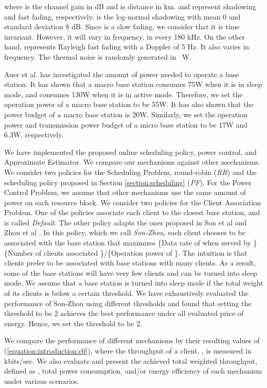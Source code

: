 \documentclass[conference]{IEEEtran}
\begin{document}
where  is the channel gain in dB and  is distance in km.  and  represent shadowing and fast fading, respectively.  is the log-normal shadowing with mean 0 and standard deviation 8 dB. Since  is a slow fading, we consider that it is time invariant. However, it will vary in frequency, in every 180 kHz. On the other hand,  represents Rayleigh fast fading with a Doppler of 5 Hz. It also varies in frequency. The thermal noise is randomly generated in ~W.

Auer et al. \cite{Auer11} has investigated the amount of power needed to operate a base station. It has shown that a macro base station consumes 75W when it is in sleep mode, and consumes 130W when it is in active mode. Therefore, we set the operation power of a macro base station to be 55W. It has also shown that the power budget of a macro base station is 20W. Similarly, we set the operation power and transmission power budget of a micro base station to be 17W and 6.3W, respectively.


We have implemented the proposed online scheduling policy, power control, and Approximate Estimator. We compare our mechanisms against other mechanisms. We consider two policies for the Scheduling Problem, round-robin (\emph{RR}) and the scheduling policy proposed in Section \ref{section:scheduling} (\emph{PF}). For the Power Control Problem, we assume that other mechanisms use the same amount of power on each resource block. We consider two policies for the Client Association Problem. One of the policies associate each client to the closest base station, and is called \emph{Default}. The other policy adapts the ones proposed in Son et al \cite{kson11} and Zhou et al \cite{SZ09}. In this policy, which we call \emph{Son-Zhou}, each client  chooses to be associated with the base station  that maximizes \{Data rate of  when served by \}\{Number of clients associated \}/\{Operation power of \}. The intuition is that clients prefer to be associated with base stations with many clients. As a result, some of the base stations will have very few clients and can be turned into sleep mode. We assume that a base station is turned into sleep mode if the total weight of its clients is below a certain threshold. We have exhaustively evaluated the performance of Son-Zhou using different thresholds and found that setting the threshold to be 2 achieves the best performance under all evaluated price of energy. Hence, we set the threshold to be 2.

We compare the performance of different mechanisms by their resulting values of (\ref{equation:introduction:c0}), where the throughput of a client, , is measured in kbits/sec.  We also evaluate and present the achieved total weighted throughput, defined as , total power consumption, and/or energy efficiency of each mechanism under various scenarios.
\end{document}
